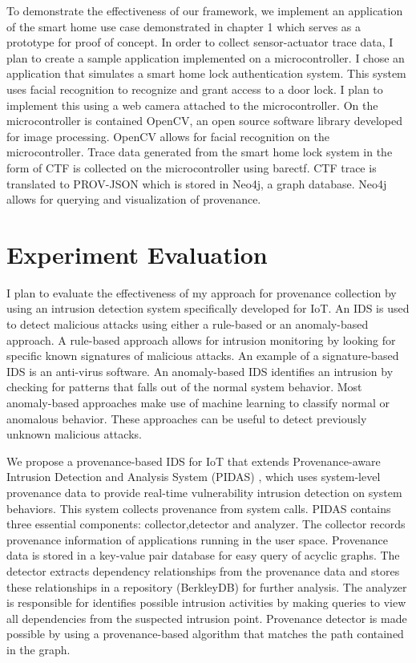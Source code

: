To demonstrate the effectiveness of our framework, we implement an application of the smart home use case demonstrated in chapter 1 which serves as a prototype for proof of concept. In order to collect sensor-actuator trace data, I plan to create a sample application implemented on a microcontroller. I chose an application that simulates a smart home lock authentication system. This system uses facial recognition to recognize and grant access to a door lock. I plan to implement this using a web camera attached to the microcontroller. On the microcontroller is contained OpenCV, an open source software library developed for image processing. OpenCV allows for facial recognition on the microcontroller. Trace data generated from the smart home lock system in the form of CTF is collected on the microcontroller using barectf. CTF trace is translated to PROV-JSON which is stored in Neo4j, a graph database. Neo4j allows for querying and visualization of provenance. 




\section{Experiment Evaluation}

I plan to evaluate the effectiveness of my approach for provenance collection by using an intrusion detection system specifically developed for IoT. An IDS is used to detect malicious attacks using either a rule-based or an anomaly-based approach. A rule-based approach allows for intrusion monitoring by looking for specific known signatures of malicious attacks. An example of a signature-based IDS is an anti-virus software. An anomaly-based IDS identifies an intrusion by checking for patterns that falls out of the normal system behavior. Most anomaly-based approaches make use of machine learning to classify normal or anomalous behavior. These approaches can be useful to detect previously unknown malicious attacks. 
\par We propose a provenance-based IDS for IoT that extends Provenance-aware Intrusion Detection and Analysis System (PIDAS) \cite{Xie:2016:UID:2936026.2936232}, which uses system-level provenance data to provide real-time vulnerability intrusion detection on system behaviors. This system collects provenance from system calls. PIDAS contains three essential components: collector,detector and analyzer. The collector records provenance information of applications running in the user space. Provenance data is stored in a key-value pair database for easy query of acyclic graphs. The detector extracts dependency relationships from the provenance data and stores these relationships in a repository (BerkleyDB) for further analysis. The analyzer is responsible for identifies possible intrusion activities by making queries to view all dependencies from the suspected intrusion point. Provenance detector is made possible by using a provenance-based algorithm that matches the path contained in the graph.


